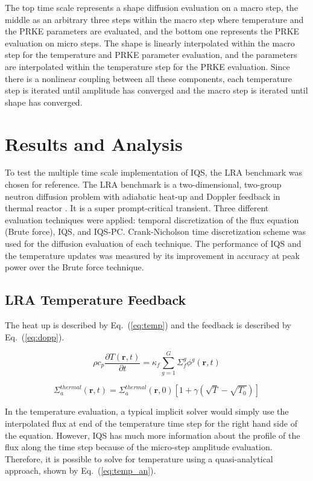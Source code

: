\documentclass{anstrans}
\renewcommand{\vec}[1]{\bm{#1}} %
\newcommand{\eqt}[1]{Eq.~(\ref{#1})}                     %
\newcommand{\be}{\begin{equation}}
\newcommand{\ee}{\end{equation}}
\begin{document}
The top time scale represents a shape diffusion evaluation on a macro step, the middle as an arbitrary 
three steps within the macro step where temperature and the PRKE parameters are evaluated, and the 
bottom one represents the PRKE evaluation on micro steps.  The shape is linearly interpolated within 
the macro step for the temperature and PRKE parameter evaluation, and the parameters are interpolated 
within the temperature step for the PRKE evaluation.  Since there is a nonlinear coupling between all 
these components, each temperature step is iterated until amplitude has converged and the macro step is iterated until shape has converged.

\section{Results and Analysis}

To test the multiple time scale implementation of IQS, the LRA benchmark was chosen for reference. The LRA benchmark is a two-dimensional, two-group neutron diffusion problem with adiabatic heat-up and Doppler feedback in thermal reactor \cite{ANL_BPB}.  It is a super prompt-critical transient. Three different evaluation techniques were applied: temporal discretization of the flux equation (Brute force), IQS, and IQS-PC. Crank-Nicholson time discretization scheme was used for the diffusion evaluation of each technique.  The performance of IQS and the temperature updates was measured by its improvement in accuracy at peak power over the Brute force technique.

\subsection{LRA Temperature Feedback}

The heat up is described by \eqt{eq:temp} and the feedback is described by \eqt{eq:dopp}.

\be
\rho c_p \frac{\partial T(\vec{r},t)}{\partial t} = \kappa_f \sum^G_{g=1}\Sigma_f^g \phi^g(\vec{r},t)
\label{eq:temp}
\ee

\be
\Sigma_a^{thermal}(\vec{r},t) = \Sigma_a^{thermal}(\vec{r},0)\left[1+\gamma\left(\sqrt{T}-\sqrt{T_0}\right)\right]
\label{eq:dopp}
\ee

In the temperature evaluation, a typical implicit solver would simply use the interpolated flux at end of the temperature time step for the right hand side of the equation.  However, IQS has much more information about the profile of the flux along the time step because of the micro-step amplitude evaluation.  Therefore, it is possible to solve for temperature using a quasi-analytical approach, shown by \eqt{eq:temp_an}.
\end{document}
